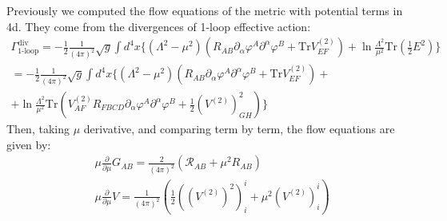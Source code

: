 \documentclass[fleqn]{article}
\begin{document}
Previously we computed the flow equations of the metric with potential terms in 4d. They come from the divergences of 1-loop effective action:
\begin{align}
\Gamma_{\text{1-loop}} ^{\text{div}} =  -\frac{1}{2}\frac{1}{(4\pi)^{2}}\sqrt{g} \int d^{4}x\lbrace (\Lambda ^{2} - \mu^{2} )(R_{AB} \partial _{\alpha} \varphi ^{A} \partial ^{\alpha}\varphi ^{B} + \text{Tr} V_{EF}^{(2)} ) + \ln \frac{\Lambda ^{2}}{\mu ^{2}} \text{Tr}(\frac{1}{2}E^{2}) \rbrace \\
= -\frac{1}{2}\frac{1}{(4\pi)^{2}}\sqrt{g} \int d^{4}x\lbrace (\Lambda ^{2} - \mu^{2} )(R_{AB} \partial _{\alpha} \varphi ^{A} \partial ^{\alpha}\varphi ^{B} + \text{Tr} V_{EF}^{(2)} )+ \nonumber \\ + \ln \frac{\Lambda ^{2}}{\mu ^{2}} \text{Tr}(V_{AF}^{(2)} R_{FBCD}\partial _{\alpha} \varphi ^{A} \partial ^{\alpha}\varphi^{B} + \frac{1}{2} (V^{(2)})_{GH}^{2}) \rbrace
\end{align}
Then, taking $\mu$ derivative, and comparing term by term, the flow equations are given by:
\begin{align}
&\mu \frac{\partial}{\partial \mu} G_{AB} = \frac{2}{(4\pi)^{2}}(\mathcal{R} _{AB} + \mu ^{2} R_{AB}) \\
&\mu \frac{\partial}{\partial \mu} V = \frac{1}{(4\pi)^{2}} (\frac{1}{2} ((V^{(2)})^{2} )_{i}^{i} +  \mu ^{2} (V^{(2)})_{i}^{i})
\end{align}
\end{document}
